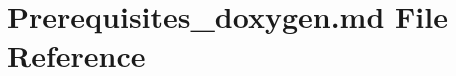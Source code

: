 \hypertarget{Prerequisites__doxygen_8md}{\section{Prerequisites\-\_\-doxygen.\-md File Reference}
\label{Prerequisites__doxygen_8md}
}
